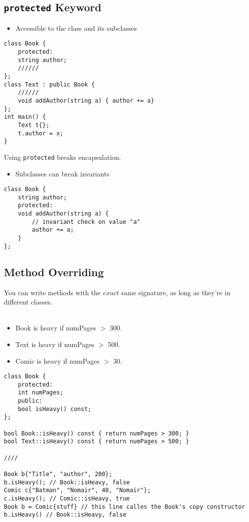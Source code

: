 \documentclass[12pt]{article}
\begin{document}
\subsection{\lstinline{protected} Keyword}
\begin{itemize}
    \item Accessible to the class and its subclasses
\end{itemize}
\begin{lstlisting}
class Book {
    protected:
    string author;
    //////
};
class Text : public Book {
    //////
    void addAuthor(string a) { author += a}
};
int main() {
    Text t{};
    t.author = x;
}
\end{lstlisting}
Using \lstinline{protected} breaks encapsulation.
\begin{itemize}
    \item Subclasses can break invariants
\end{itemize}
\begin{lstlisting}
class Book {
    string author;
    protected:
    void addAuthor(string a) {
        // invariant check on value "a"
        author += a;
    }
};
\end{lstlisting}

\subsection{Method Overriding}
You can write methods with the $exact$ same signature, as long as they're in different classes.\\\\
\begin{itemize}
    \item Book is heavy if numPages $>$ 300.
    \item Text is heavy if numPages $>$ 500.
    \item Comic is heavy if numPages $>$ 30.
\end{itemize}
\begin{lstlisting}
class Book {
    protected:
    int numPages;
    public:
    bool isHeavy() const;
};

bool Book::isHeavy() const { return numPages > 300; }
bool Text::isHeavy() const { return numPages > 500; }

////

Book b{"Title", "author", 200};
b.isHeavy(); // Book::isHeavy, false
Comic c{"Batman", "Nomair", 40, "Nomair"};
c.isHeavy(); // Comic::isHeavy, true
Book b = Comic{stuff} // this line calles the Book's copy constructor
b.isHeavy() // Book::isHeavy, false
\end{lstlisting}
\end{document}
